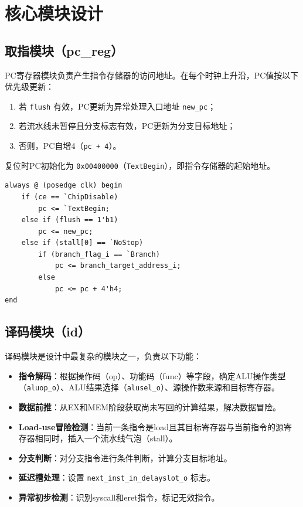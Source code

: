 \section{核心模块设计}

\subsection{取指模块（pc\_reg）}

PC寄存器模块负责产生指令存储器的访问地址。在每个时钟上升沿，PC值按以下优先级更新：

\begin{enumerate}[leftmargin=2em]
    \item 若 \texttt{flush} 有效，PC更新为异常处理入口地址 \texttt{new\_pc}；
    \item 若流水线未暂停且分支标志有效，PC更新为分支目标地址；
    \item 否则，PC自增4（\texttt{pc + 4}）。
\end{enumerate}

复位时PC初始化为 \texttt{0x00400000}（\texttt{TextBegin}），即指令存储器的起始地址。

\begin{lstlisting}[caption={pc\_reg模块核心逻辑}]
always @ (posedge clk) begin
    if (ce == `ChipDisable)
        pc <= `TextBegin;
    else if (flush == 1'b1)
        pc <= new_pc;
    else if (stall[0] == `NoStop)
        if (branch_flag_i == `Branch)
            pc <= branch_target_address_i;
        else
            pc <= pc + 4'h4;
end
\end{lstlisting}

\subsection{译码模块（id）}

译码模块是设计中最复杂的模块之一，负责以下功能：

\begin{itemize}[leftmargin=2em]
    \item \textbf{指令解码}：根据操作码（op）、功能码（func）等字段，确定ALU操作类型（\texttt{aluop\_o}）、ALU结果选择（\texttt{alusel\_o}）、源操作数来源和目标寄存器。
    \item \textbf{数据前推}：从EX和MEM阶段获取尚未写回的计算结果，解决数据冒险。
    \item \textbf{Load-use冒险检测}：当前一条指令是load且其目标寄存器与当前指令的源寄存器相同时，插入一个流水线气泡（stall）。
    \item \textbf{分支判断}：对分支指令进行条件判断，计算分支目标地址。
    \item \textbf{延迟槽处理}：设置 \texttt{next\_inst\_in\_delayslot\_o} 标志。
    \item \textbf{异常初步检测}：识别syscall和eret指令，标记无效指令。
\end{itemize}

